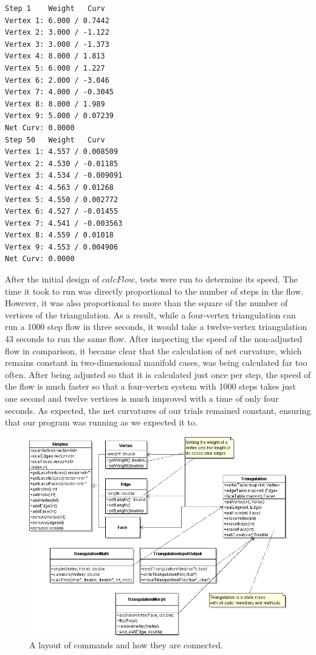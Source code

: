 \documentclass[12pt]{article}
\begin{document}
\begin{multicols}{2}
\begin{verbatim}
Step 1    Weight   Curv
Vertex 1: 6.000 / 0.7442
Vertex 2: 3.000 / -1.122
Vertex 3: 3.000 / -1.373
Vertex 4: 8.000 / 1.813
Vertex 5: 6.000 / 1.227
Vertex 6: 2.000 / -3.046
Vertex 7: 4.000 / -0.3045
Vertex 8: 8.000 / 1.989
Vertex 9: 5.000 / 0.07239
Net Curv: 0.0000
Step 50   Weight   Curv
Vertex 1: 4.557 / 0.008509
Vertex 2: 4.530 / -0.01185
Vertex 3: 4.534 / -0.009091
Vertex 4: 4.563 / 0.01268
Vertex 5: 4.550 / 0.002772
Vertex 6: 4.527 / -0.01455
Vertex 7: 4.541 / -0.003563
Vertex 8: 4.559 / 0.01018
Vertex 9: 4.553 / 0.004906
Net Curv: 0.0000
\end{verbatim}
\end{multicols}

\noindent After the initial design of $calcFlow$, tests were run to determine its speed. The time it took to run was directly proportional to the number of steps in the flow. However, it was also proportional to more than the square of the number of vertices of the triangulation. As a result, while a four-vertex triangulation can run a 1000 step flow in three seconds, it would take a twelve-vertex triangulation 43 seconds to run the same flow. After inspecting the speed of the non-adjusted flow in comparison, it became clear that the calculation of net curvature, which remains constant in two-dimensional manifold cases, was being calculated far too often. After being adjusted so that it is calculated just once per step, the speed of the flow is much faster so that a four-vertex system with 1000 steps takes just one second and twelve vertices is much improved with a time of only four seconds. As expected, the net curvatures of our trials remained constant, ensuring that our program was running as we expected it to.\newline
  
\begin{figure}
\includegraphics[scale = 0.5]{triangulationUML.png}
\caption{A layout of commands and how they are connected.}
\label{triUML}
\end{figure}
  
\end{document}
